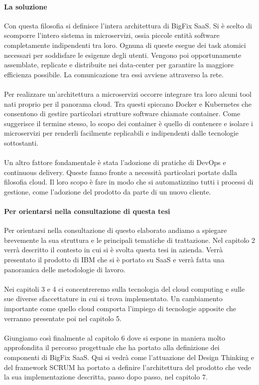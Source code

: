 \paragraph{La soluzione}
Con questa filosofia si definisce l'intera architettura di BigFix SaaS. Si è scelto di scomporre l'intero sistema in microservizi, ossia piccole entità software completamente indipendenti tra loro. Ognuna di queste esegue dei task atomici necessari per soddisfare le esigenze degli utenti. Vengono poi opportunamente assemblate, replicate e distribuite nei data-center per garantire la maggiore efficienza possibile. La comunicazione tra essi avviene attraverso la rete.
\paragraph{}
Per realizzare un'architettura a microservizi occorre integrare tra loro alcuni tool nati proprio per il panorama cloud. Tra questi spiccano Docker e Kubernetes che consentono di gestire particolari strutture software chiamate container. Come suggerisce il termine stesso, lo scopo dei container è quello di contenere e isolare i microservizi per renderli facilmente replicabili e indipendenti dalle tecnologie sottostanti.
\paragraph{}
Un altro fattore fondamentale è stata l'adozione di pratiche di DevOps e continuous delivery. Queste fanno fronte a necessità particolari portate dalla filosofia cloud. Il loro scopo è fare in modo che si automatizzino tutti i processi di gestione, come l'adozione del prodotto da parte di un nuovo cliente.

\paragraph{Per orientarsi nella consultazione di questa tesi}
Per orientarsi nella consultazione di questo elaborato andiamo a spiegare brevemente la sua struttura e le principali tematiche di trattazione. Nel capitolo 2 verrà descritto il contesto in cui si è svolta questa tesi in azienda. Verrà presentato il prodotto di IBM che si è portato su SaaS e verrà fatta una panoramica delle metodologie di lavoro.
\paragraph{}
Nei capitoli 3 e 4 ci concentreremo sulla tecnologia del cloud computing e sulle sue diverse sfaccettature in cui si trova implementato. Un cambiamento importante come quello cloud comporta l'impiego di tecnologie apposite che verranno presentate poi nel capitolo 5.
\paragraph{}
Giungiamo così finalmente al capitolo 6 dove si espone in maniera molto approfondita il percorso progettuale che ha portato alla definizione dei componenti di BigFix SaaS. Qui si vedrà come l'attuazione del Design Thinking e del framework SCRUM ha portato a definire l'architettura del prodotto che vede la sua implementazione descritta, passo dopo passo, nel capitolo 7.